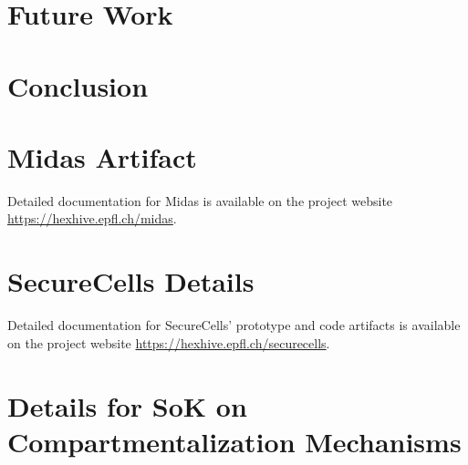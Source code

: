 \documentclass[lablogo]{thesis}
\newcommand{\seccells}{SecureCells\xspace}
\newcommand{\midas}{Midas\xspace}
\begin{document}
\chapter{Future Work}
\label{ch:future}


\chapter{Conclusion}
\label{ch:conclusion}


\begin{appendices}
\chapter{\midas Artifact}

Detailed documentation for \midas is available on the project website 
\url{https://hexhive.epfl.ch/midas}.



\chapter{\seccells Details}

Detailed documentation for \seccells{}' prototype and code artifacts is
available on the project website \url{https://hexhive.epfl.ch/securecells}.



\chapter{Details for SoK on Compartmentalization Mechanisms}


\end{appendices}

\backmatter

{}
\printbibliography
\end{document}
